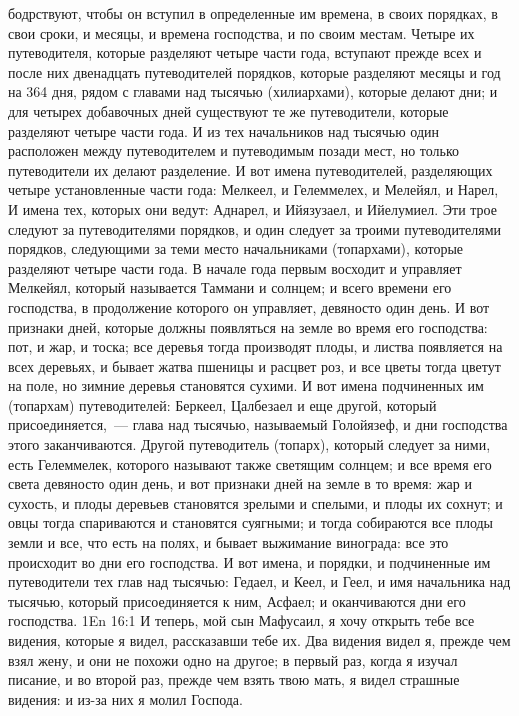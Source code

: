 бодрствуют, чтобы он вступил в определенные им времена, в своих порядках, в
свои сроки, и месяцы, и времена господства, и по своим местам.
Четыре их путеводителя, которые разделяют четыре части года, вступают
прежде всех и после них двенадцать путеводителей порядков, которые разделяют
месяцы и год на 364 дня, рядом с главами над тысячью (хилиархами), которые
делают дни; и для четырех добавочных дней существуют те же путеводители,
которые разделяют четыре части года.
И из тех начальников над тысячью один расположен между путеводителем и
путеводимым позади мест, но только путеводители их делают разделение.
И вот имена путеводителей, разделяющих четыре установленные части
года: Мелкеел, и Гелеммелех, и Мелейял, и Нарел, И имена тех, которых они
ведут: Аднарел, и Ийязузаел, и Ийелумиел.
Эти трое следуют за путеводителями порядков, и один следует за троими
путеводителями порядков, следующими за теми место начальниками (топархами),
которые разделяют четыре части года.
В начале года первым восходит и управляет Мелкейял, который называется
Таммани и солнцем; и всего времени его господства, в продолжение которого он
управляет, девяносто один день.
И вот признаки дней, которые должны появляться на земле во время его
господства: пот, и жар, и тоска; все деревья тогда производят плоды, и листва
появляется на всех деревьях, и бывает жатва пшеницы и расцвет роз, и все цветы
тогда цветут на поле, но зимние деревья становятся сухими.
И вот имена подчиненных им (топархам) путеводителей: Беркеел,
Цалбезаел и еще другой, который присоединяется,~--- глава над тысячью, называемый
Голойязеф, и дни господства этого заканчиваются.
Другой путеводитель (топарх), который следует за ними, есть
Гелеммелек, которого называют также светящим солнцем; и все время его света
девяносто один день, и вот признаки дней на земле в то время: жар и сухость, и
плоды деревьев становятся зрелыми и спелыми, и плоды их сохнут; и овцы тогда
спариваются и становятся суягными; и тогда собираются все плоды земли и все,
что есть на полях, и бывает выжимание винограда: все это происходит во дни его
господства.
И вот имена, и порядки, и подчиненные им путеводители тех глав над
тысячью: Гедаел, и Кеел, и Геел, и имя начальника над тысячью, который
присоединяется к ним, Асфаел; и оканчиваются дни его господства.
\vs 1En 16:1
И теперь, мой сын Мафусаил, я хочу открыть тебе все видения,
которые я видел, рассказавши тебе их.
Два видения видел я, прежде чем взял жену, и они не похожи одно на
другое; в первый раз, когда я изучал писание, и во второй раз, прежде чем взять
твою мать, я видел страшные видения: и из-за них я молил Господа.
